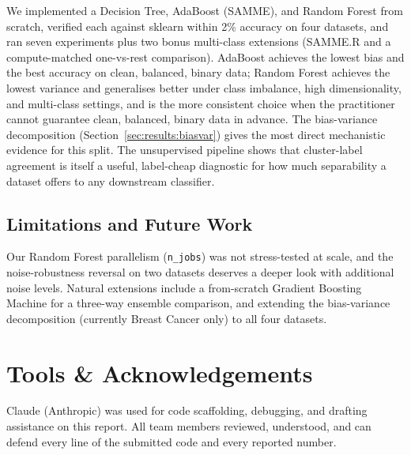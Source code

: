 \documentclass[conference]{IEEEtran}
\begin{document}
We implemented a Decision Tree, AdaBoost (SAMME), and Random Forest from
scratch, verified each against sklearn within 2\% accuracy on four datasets,
and ran seven experiments plus two bonus multi-class extensions
(SAMME.R and a compute-matched one-vs-rest comparison). AdaBoost achieves
the lowest bias and the best accuracy on clean, balanced, binary data;
Random Forest achieves the lowest variance and generalises better under
class imbalance, high dimensionality, and multi-class settings, and is the
more consistent choice when the practitioner cannot guarantee clean,
balanced, binary data in advance. The bias-variance decomposition
(Section~\ref{sec:results:biasvar}) gives the most direct mechanistic
evidence for this split. The unsupervised pipeline shows that cluster-label
agreement is itself a useful, label-cheap diagnostic for how much
separability a dataset offers to any downstream classifier.

\subsection{Limitations and Future Work}
Our Random Forest parallelism (\texttt{n\_jobs}) was not stress-tested at
scale, and the noise-robustness reversal on two datasets deserves a deeper
look with additional noise levels. Natural extensions include a from-scratch
Gradient Boosting Machine for a three-way ensemble comparison, and
extending the bias-variance decomposition (currently Breast Cancer only) to
all four datasets.

\section*{Tools \& Acknowledgements}
Claude (Anthropic) was used for code scaffolding, debugging, and drafting
assistance on this report. All team members reviewed, understood, and can
defend every line of the submitted code and every reported number.
\end{document}
